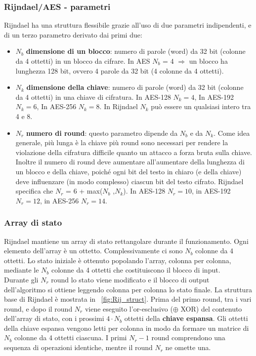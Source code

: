 \subsubsection{Rijndael/AES - parametri}
Rijndael ha una struttura flessibile grazie all'uso di due parametri indipendenti, e di un terzo parametro derivato dai primi due:
\begin{itemize}
  \item $N_{b}$ \textbf{dimensione di un blocco}: numero di parole (word) da 32 bit (colonne da 4 ottetti) in un blocco da cifrare. In AES $N_{b}$ = 4 $\Rightarrow$ un blocco ha lunghezza 128 bit, ovvero 4 parole da 32 bit (4 colonne da 4 ottetti).
  \item $N_{k}$ \textbf{dimensione della chiave}: numero di parole (word) da 32 bit (colonne da 4 ottetti) in una chiave di cifratura. In AES-128 $N_{k} = 4$, In AES-192 $N_{k} = 6$, In AES-256 $N_{k} = 8$. In Rijndael $N_{k}$ può essere un qualsiasi intero tra 4 e 8.
  \item $N_{r}$ \textbf{numero di round}: questo parametro dipende da $N_{b}$ e da $N_{k}$. Come idea generale, più lunga è la chiave più round sono necessari per rendere la violazione della cifratura difficile quanto un attacco a forza bruta sulla chiave. Inoltre il numero di round deve aumentare all'aumentare della lunghezza di un blocco e della chiave, poiché ogni bit del testo in chiaro (e della chiave) deve influenzare (in modo complesso) ciascun bit del testo cifrato. Rijndael specifica che $N_{r}$ = 6 + max($N_{b}$ ,$N_{k}$). In AES-128 $N_{r} = 10$, in AES-192 $N_{r} = 12$, in AES-256 $N_{r} = 14$.
\end{itemize}
  
\subsubsection{Array di stato}
Rijndael mantiene un array di stato rettangolare durante il funzionamento. Ogni elemento dell'array è un ottetto. Complessivamente ci sono $N_{b}$ colonne da 4 ottetti. Lo stato iniziale è ottenuto popolando l'array, colonna per colonna, mediante le $N_{b}$ colonne da 4 ottetti che costituiscono il blocco di input. \\
\newline
Durante gli $N_{r}$ round lo stato viene modificato e il blocco di output dell'algoritmo si ottiene leggendo colonna per colonna lo stato finale. 
\newline \newline 
La struttura base di Rijndael è mostrata in \figurename~\ref{fig:Rij_struct}. Prima del primo round, tra i vari round, e dopo il round $N_{r}$ viene eseguito l'or-esclusivo ($\oplus$ XOR) del contenuto dell'array di stato, con i prossimi $4\cdot N_{b}$ ottetti della \textbf{chiave espansa}. Gli ottetti della chiave espansa vengono letti per colonna in modo da formare un matrice di $N_{b}$ colonne da 4 ottetti ciascuna. I primi $N_{r} - 1$ round comprendono una sequenza di operazioni identiche, mentre il round $N_{r}$ ne omette una.

